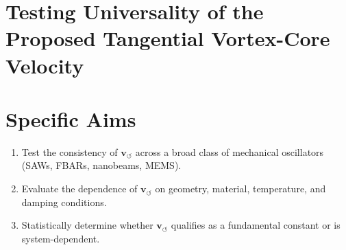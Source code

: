 %
%
    \section{\textbf{Testing Universality of the Proposed Tangential Vortex-Core Velocity}}
        \section*{Specific Aims}
        \begin{enumerate}[label=\textbf{Aim \arabic*.}]
            \item Test the consistency of \( \mathbf{v}_{\scriptscriptstyle\boldsymbol{\circlearrowleft}} \) across a broad class of mechanical oscillators (SAWs, FBARs, nanobeams, MEMS).
            \item Evaluate the dependence of \( \mathbf{v}_{\scriptscriptstyle\boldsymbol{\circlearrowleft}} \) on geometry, material, temperature, and damping conditions.
            \item Statistically determine whether \( \mathbf{v}_{\scriptscriptstyle\boldsymbol{\circlearrowleft}} \) qualifies as a fundamental constant or is system-dependent.
        \end{enumerate}

